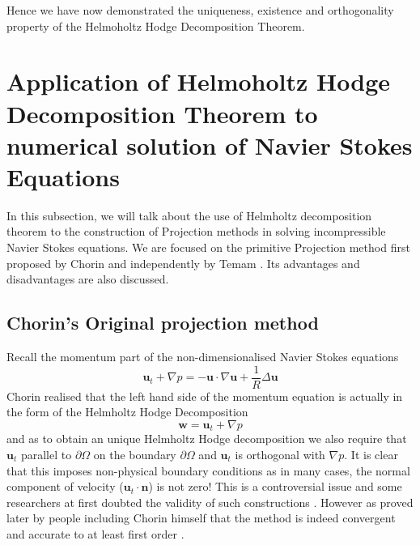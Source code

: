 Hence we have now demonstrated the uniqueness, existence and orthogonality property of the Helmoholtz Hodge Decomposition Theorem.

\newpage
\section{Application of Helmoholtz Hodge Decomposition Theorem to numerical solution of Navier Stokes Equations}
In this subsection, we will talk about the use of Helmholtz decomposition theorem to the construction of Projection methods in solving incompressible Navier Stokes equations. We are focused on the primitive Projection method first proposed by Chorin and independently by Temam \cite{chorin1968numerical,temam1969approximation,brown2001accurate}. Its advantages and disadvantages are also discussed.\\

\subsection{Chorin's Original projection method}
Recall the momentum part of the non-dimensionalised Navier Stokes equations
\begin{equation}\label{eq:momentum equation}
\textbf{u}_t + \nabla \textit{p} = - \textbf{u} \cdot \nabla \textbf{u} + \dfrac{1}{R} \Delta \textbf{u}
\end{equation}
Chorin realised that the left hand side of the momentum equation is actually in the form of the Helmholtz Hodge Decomposition \cite{chorin1968numerical,chorin1990mathematical,brown2001accurate}
\begin{equation}
\textbf{w} = \textbf{u}_t + \nabla \textit{p} 
\end{equation}
and as to obtain an unique Helmholtz Hodge decomposition we also require that $\textbf{u}_t$ parallel to $\partial \Omega$ on the boundary $\partial \Omega$ and $\textbf{u}_t$ is orthogonal with $\nabla p$. It is clear that this imposes non-physical boundary conditions as in many cases, the normal component of velocity ($\textbf{u}_t \cdot \textbf{n}$) is not zero! This is a controversial issue and some researchers at first doubted the validity of such constructions \cite{perot1993analysis,brown2001accurate,shen1992error}. However as proved later by people including Chorin himself that the method is indeed convergent and accurate to at least first order \cite{chorin1969convergence,shen1992error,rannacher1992chorin,perot1993analysis,brown2001accurate}. 

